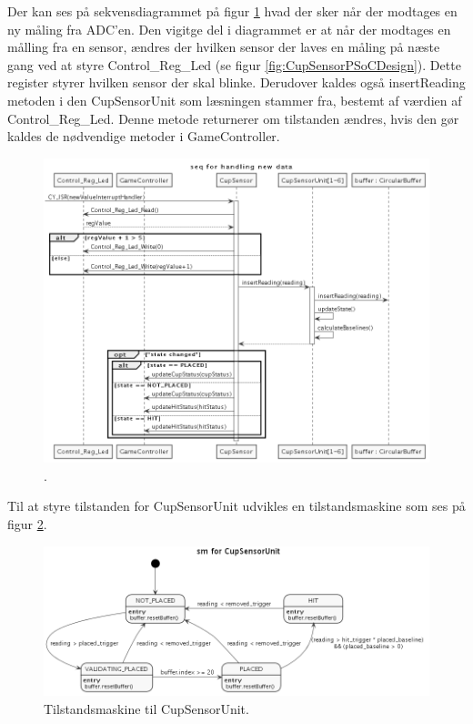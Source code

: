 \documentclass[Rapport/Rapport_main.tex]{subfiles}
\begin{document}
Der kan ses på sekvensdiagrammet på figur \ref{fig:CupSensor-IF-getting-reading} hvad der sker når der modtages en ny måling fra ADC'en. Den vigitge del i diagrammet er at når der modtages en målling fra en sensor, ændres der hvilken sensor der laves en måling på næste gang ved at styre Control\_Reg\_Led (se figur \ref{fig:CupSensorPSoCDesign}). Dette register styrer hvilken sensor der skal blinke. Derudover kaldes også insertReading metoden i den CupSensorUnit som læsningen stammer fra, bestemt af værdien af Control\_Reg\_Led. Denne metode returnerer om tilstanden ændres, hvis den gør kaldes de nødvendige metoder i GameController. 
\begin{figure}[H]
    \centering
    \includegraphics[width=1\textwidth]{Softwaredesign/CupSensor_IF/graphics/getting_reading.png}
    \caption{.}
    \label{fig:CupSensor-IF-getting-reading}
\end{figure}

Til at styre tilstanden for CupSensorUnit udvikles en tilstandsmaskine som ses på figur \ref{fig:CupSensor-IF-state}. 

\begin{figure}[H]
    \centering
    \includegraphics[width=1\textwidth]{Softwaredesign/CupSensor_IF/graphics/state.png}
    \caption{Tilstandsmaskine til CupSensorUnit.}
    \label{fig:CupSensor-IF-state}
\end{figure}
\end{document}
